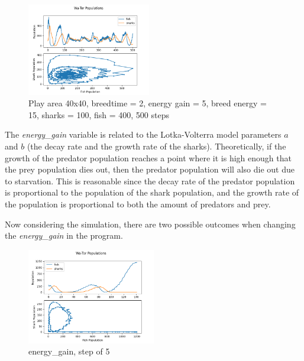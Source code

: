 \documentclass[12pt]{iopart} %
\begin{document}
\begin{figure}[h!tbp]
  \begin{center}
  \item[]\includegraphics[width=0.48\textwidth]{figure13.png}
  \caption{\label{fig:figure13}
  Play area 40x40, breedtime = 2, energy gain = 5, breed energy = 15, sharks = 100, fish = 400, 500 steps
  }
  \end{center}
\end{figure}

\pagebreak

\subtitle{\textbf{Relationship Between Main Simulation Parameters and Lotka-Volterra Constants}}

The \emph{energy\_gain} variable is related to the Lotka-Volterra model parameters $a$ and $b$ (the decay rate and the growth rate of the sharks). 
Theoretically, if the growth of the predator population reaches a point where it is high enough that the prey population dies out, then the predator population will also die out due to starvation. 
This is reasonable since the decay rate of the predator population is proportional to the population of the shark population, and the growth rate of the population is proportional to both the amount of predators and prey.

Now considering the simulation, there are two possible outcomes when changing the \emph{energy\_gain} in the program.

\begin{figure}[h!tbp]
  \begin{center}
  \item[]\includegraphics[width=0.5\textwidth]{figure14.png}
  \caption{\label{fig:figure14}
  energy\_gain, step of 5
  }
  \end{center}
\end{figure}
\end{document}
